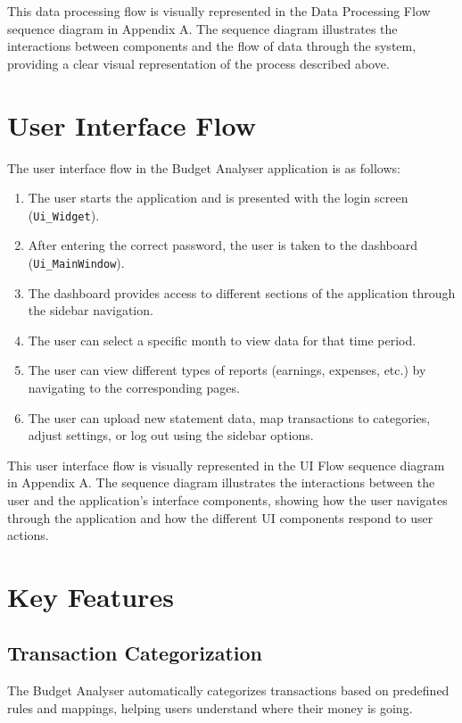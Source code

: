 \documentclass[11pt,a4paper]{report}
\begin{document}
This data processing flow is visually represented in the Data Processing Flow sequence diagram in Appendix A. The sequence diagram illustrates the interactions between components and the flow of data through the system, providing a clear visual representation of the process described above.

\section{User Interface Flow}
The user interface flow in the Budget Analyser application is as follows:

\begin{enumerate}
    \item The user starts the application and is presented with the login screen (\texttt{Ui\_Widget}).
    \item After entering the correct password, the user is taken to the dashboard (\texttt{Ui\_MainWindow}).
    \item The dashboard provides access to different sections of the application through the sidebar navigation.
    \item The user can select a specific month to view data for that time period.
    \item The user can view different types of reports (earnings, expenses, etc.) by navigating to the corresponding pages.
    \item The user can upload new statement data, map transactions to categories, adjust settings, or log out using the sidebar options.
\end{enumerate}

This user interface flow is visually represented in the UI Flow sequence diagram in Appendix A. The sequence diagram illustrates the interactions between the user and the application's interface components, showing how the user navigates through the application and how the different UI components respond to user actions.

\section{Key Features}

\subsection{Transaction Categorization}
The Budget Analyser automatically categorizes transactions based on predefined rules and mappings, helping users understand where their money is going.
\end{document}
